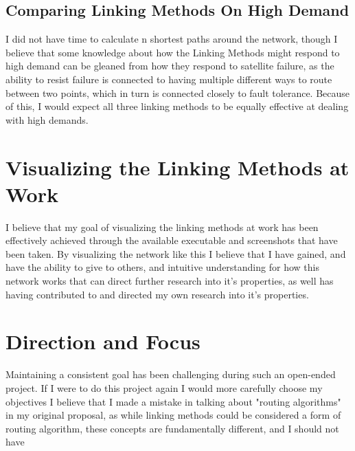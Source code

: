 \documentclass[12pt,a4paper,twoside,openright]{report}
\begin{document}

\subsection{Comparing Linking Methods On High Demand}
I did not have time to calculate n shortest paths around the network, though I believe that some knowledge about how the Linking Methods might respond to high demand can be gleaned from how they respond to satellite failure, as the ability to resist failure is connected to having multiple different ways to route between two points, which in turn is connected closely to fault tolerance. Because of this, I would expect all three linking methods to be equally effective at dealing with high demands.


\section{Visualizing the Linking Methods at Work}

I believe that my goal of visualizing the linking methods at work has been effectively achieved through the available executable and screenshots that have been taken. By visualizing the network like this I believe that I have gained, and have the ability to give to others, and intuitive understanding for how this network works that can direct further research into it's properties, as well has having contributed to and directed my own research into it's properties.

\section{Direction and Focus}

Maintaining a consistent goal has been challenging during such an open-ended project. If I were to do this project again I would more carefully choose my objectives I believe that I made a mistake in talking about "routing algorithms" in my original proposal, as while linking methods could be considered a form of routing algorithm, these concepts are fundamentally different, and I should not have 
\end{document}
